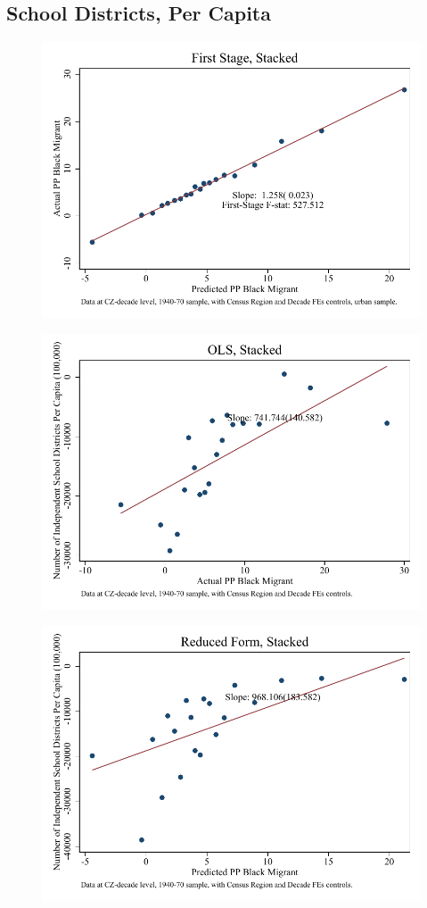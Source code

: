 \documentclass{article}
\begin{document}
\subsection{School Districts, Per Capita}

\clearpage
\begin{figure}
\centering
\includegraphics{figures/simplefigs/stacked_schdist_ind_pc_C3_urban_fs_dc.pdf}
\end{figure}
\clearpage
\begin{figure}
\centering
\includegraphics{figures/simplefigs/stacked_schdist_ind_pc_C3_urban_ols_dc.pdf}
\end{figure}
\clearpage
\begin{figure}
\centering
\includegraphics{figures/simplefigs/stacked_schdist_ind_pc_C3_urban_rf_dc.pdf}
\end{figure}
\clearpage


\clearpage
\end{document}

